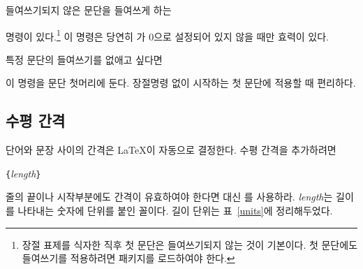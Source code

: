 들여쓰기되지 않은 문단을 들여쓰게 하는 
\begin{lscommand}
\end{lscommand}
\noindent 명령이 있다.\footnote{%
  장절 표제를 식자한 직후 첫 문단은 들여쓰기되지 않는 것이 
  기본이다. 첫 문단에도 들여쓰기를 적용하려면  패키지를 
  로드하여야 한다.
}
이 명령은 당연히 가 0으로 설정되어 있지 않을 때만 효력이 있다.

특정 문단의 들여쓰기를 없애고 싶다면
\begin{lscommand}
\end{lscommand}
\noindent 이 명령을 문단 첫머리에 둔다. 장절명령 없이 시작하는 첫 문단에 
적용할 때 편리하다.

\subsection{수평 간격}

\label{sec:hspace}
단어와 문장 사이의 간격은 \LaTeX 이 자동으로 결정한다.
수평 간격을 추가하려면 
\begin{lscommand}
\verb|{|\emph{length}\verb|}|
\end{lscommand}
\noindent 줄의 끝이나 시작부분에도 간격이 유효하여야 한다면  대신 를 사용하라.
\emph{length}는 길이를 나타내는 숫자에 단위를 붙인 꼴이다. 길이 단위는 표~\ref{units}에 정리해두었다. 

